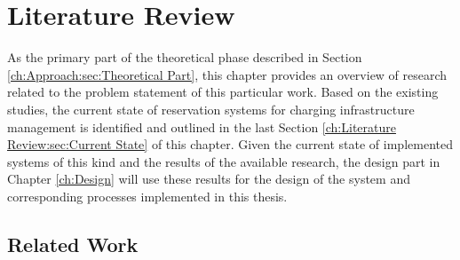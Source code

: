 

\chapter{Literature Review}
\label{ch:Literature Review}

As the primary part of the theoretical phase described in Section \ref{ch:Approach:sec:Theoretical Part}, this chapter provides an overview of research related to the problem statement of this particular work.
Based on the existing studies, the current state of reservation systems for charging infrastructure management is identified and outlined in the last Section \ref{ch:Literature Review:sec:Current State} of this chapter.
Given the current state of implemented systems of this kind and the results of the available research, the design part in Chapter \ref{ch:Design} will use these results for the design of the system and corresponding processes implemented in this thesis.

\section{Related Work}
\label{ch:Literature Review:sec:Related Work}

